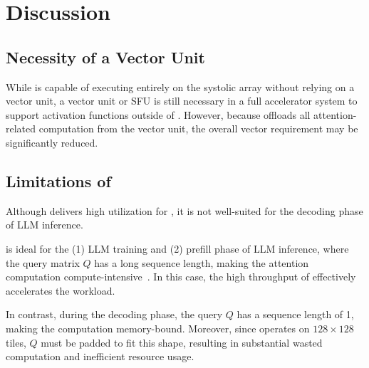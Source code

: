 \section{Discussion}





\subsection{Necessity of a Vector Unit}

While \MSAGA{} is capable of executing \FA{} entirely on the
systolic array without relying on a vector unit, a vector unit or
SFU is still necessary in a full
accelerator system to support activation functions outside of \FA{}.
However, because \MSAGA{} offloads all attention-related computation
from the vector unit, the overall vector \FLOPs{} requirement may be
significantly reduced.





\subsection{Limitations of \MSAGA{}}

Although \MSAGA{} delivers high \FLOPs{} utilization for \FA{},
it is not well-suited for the decoding phase of LLM inference.

\MSAGA{} is ideal for the (1) LLM training and (2) prefill phase of LLM inference,
where the query matrix $Q$ has a long sequence length, making the
attention computation compute-intensive~\cite{splitwise}. In this case, the high
\FLOPs{} throughput of \MSAGA{} effectively accelerates the workload.

In contrast, during the decoding phase, the query $Q$ has a
sequence length of 1, making the computation memory-bound.
Moreover, since \MSAGA{} operates on $128 \times 128$ tiles,
$Q$ must be padded to fit this shape, resulting in substantial
wasted computation and inefficient resource usage.

